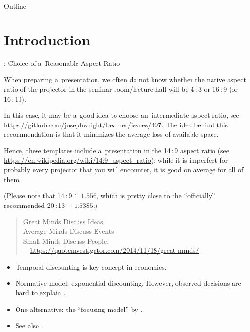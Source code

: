 \begin{frame}[standout]{Outline}

	\medskip
	\tableofcontents

\end{frame}






\section{Introduction}


\begin{frame}{\titleprefix: Choice of a~Reasonable Aspect Ratio}

	When preparing a~presentation, we often do not know whether the native aspect ratio of the projector in the seminar room/lecture hall will be 4\,:\,3 or 16\,:\,9 (or 16\,:\,10).

	In this case, it may be a~good idea to choose an~\alert{intermediate aspect ratio}, see \url{https://github.com/josephwright/beamer/issues/497}. The idea behind this recommendation is that it minimizes the average loss of available space.

	Hence, these templates include a~presentation in the \alert{14\,:\,9 aspect ratio} (see \url{https://en.wikipedia.org/wiki/14:9_aspect_ratio}): while it is imperfect for probably every projector that you will encounter, it is good on average for all of them.

	(Please note that 14\,:\,9${}\mathrel{\dot{=}} 1.556$, which is pretty close to the ``officially'' recommended 20\,:\,13${}\mathrel{\dot{=}} 1.5385$.)

\end{frame}


\begin{frame}{\titleprefix}

	\begin{quote}
		Great Minds Discuss Ideas. \\
		Average Minds Discuss Events. \\
		Small Minds Discuss People. \\
		\upshape ---\url{https://quoteinvestigator.com/2014/11/18/great-minds/}
	\end{quote}

	\begin{itemize}
		\item Temporal discounting is key concept in economics.
		\item Normative model: exponential discounting. However, observed decisions are hard to explain \citep[e.g.,][]{Dohmen2012}.
		\item One alternative: the ``focusing model'' by \cite{Koszegi2013}.
		\item See also \cite{Lisi1995}.
	\end{itemize}

\end{frame}


